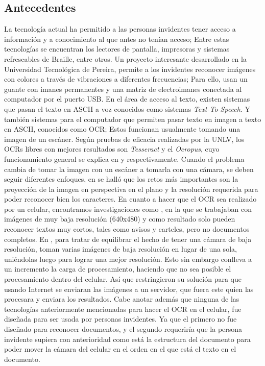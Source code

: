 \documentclass[a4paper, 11pt, oneside]{article}
\begin{document}
	\subsection {Antecedentes}
	La tecnología actual ha permitido a las personas invidentes tener acceso a información
	y a conocimiento al que antes no tenían acceso; Entre estas tecnologías se encuentran los
	lectores de pantalla, impresoras y sistemas refrescables de Braille, entre otros.
	Un proyecto interesante desarrollado en la Universidad Tecnológica de Pereira, permite
	a los invidentes reconocer imágenes con colores a través de vibraciones a diferentes
	frecuencias\cite{iris04}; Para ello, usan un guante con imanes permanentes y una matriz
	de electroimanes conectada al computador por el puerto USB.\newline
	En el área de acceso al texto, existen sistemas que pasan el texto en ASCII a voz
	conocidos como sistemas \textit{Text-To-Speech}. Y también sistemas para el computador
	que permiten pasar texto en imagen a texto en ASCII, conocidos como OCR; Estos funcionan
	usualmente tomando una imagen de un escáner. Según pruebas de eficacia realizadas por
	la UNLV, los OCRs libres con mejores resultados son	\textit{Tesseract} y el 
	\textit{Ocropus}, cuyo funcionamiento general se explica en \cite{tesseract1} y
	\cite{ocropus1} respectivamente.\newline
	Cuando el problema cambia de tomar la imagen con un escáner a tomarla con una cámara,
	se deben seguir diferentes enfoques, en\cite{doc_analysis3} se halló que los retos más
	importantes son la proyección de la imagen en perspectiva en el plano y la resolución
	requerida para poder reconocer bien los caracteres.\newline
	En cuanto a hacer que el OCR sea realizado por un celular, encontramos investigaciones
	como \cite{mob_smallpic}, en la que se trabajaban con imágenes de muy baja resolución
	(640x480) y como resultado solo pueden reconocer textos muy cortos, tales como avisos
	y carteles,	pero no documentos completos.\newline
	En \cite{mob_withpc}, para tratar de equilibrar el hecho de tener una cámara de baja
	resolución, toman varias imágenes de baja resolución en lugar de una sola, uniéndolas
	luego para lograr una mejor resolución. Esto sin embargo conlleva a un incremento la
	carga de procesamiento, haciendo que no sea posible el procesamiento dentro del celular.
	Así que restringieron su solución para que usando Internet se enviaran las imágenes a un
	servidor, que fuera este quien las procesara y enviara los resultados.\newline
	Cabe anotar además que ninguna de las tecnologías anteriormente mencionadas para hacer
	el OCR en el celular, fue diseñada para ser usada por personas invidentes. Ya que el 
	primero no fue diseñado para reconocer documentos, y el segundo requeriría que la persona
	invidente supiera con anterioridad como está la estructura del documento para poder mover
	la cámara del celular en el orden en el que está el texto en el documento.
	
\end{document}
